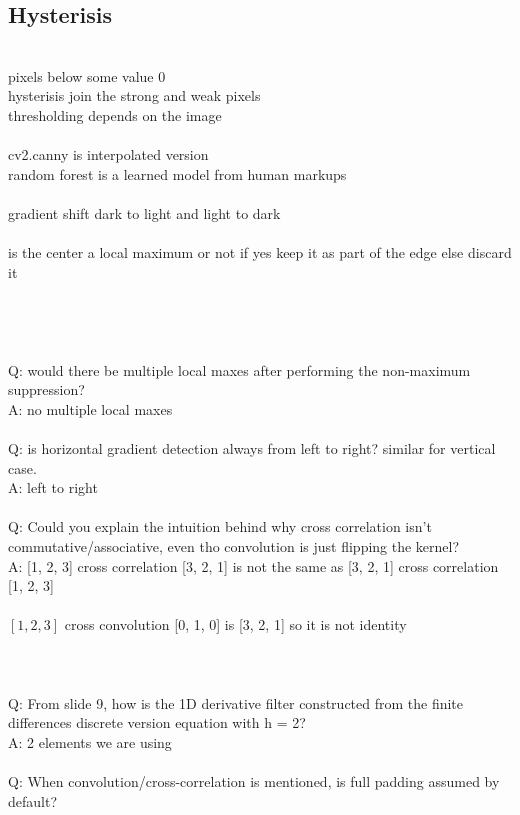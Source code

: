 \documentclass[11pt]{article}
\begin{document}
\subsection*{Hysterisis}\\
pixels below some value 0\\
hysterisis join the strong and weak pixels\\
thresholding depends on the image\\
\\
cv2.canny is interpolated version
\\
random forest is a learned model from human markups\\
\\gradient shift dark to light and light to dark
\\\\
is the center a local maximum or not
if yes keep it as part of the edge else discard it
\\
\\\\
\
\\\\
Q: would there be multiple local maxes after performing the non-maximum suppression?\\
A: no multiple local maxes
\\\\
Q: is horizontal gradient detection always from left to right? similar for vertical case.\\
A: left to right\\
\\
Q: Could you explain the intuition behind why cross correlation isn't commutative/associative, even tho convolution is just flipping the kernel?
\\
A: [1, 2, 3] cross correlation [3, 2, 1] is not the same as [3, 2, 1] cross correlation [1, 2, 3]
\\\\
$[1, 2, 3]$ cross convolution [0, 1, 0] is [3, 2, 1] so it is not identity
\\ \\\\\\
Q: From slide 9, how is the 1D derivative filter constructed from the finite differences discrete version equation with h = 2?\\
A: 2 elements we are using 
\\\\
Q: When convolution/cross-correlation is mentioned, is full padding assumed by default?\\
\end{document}
